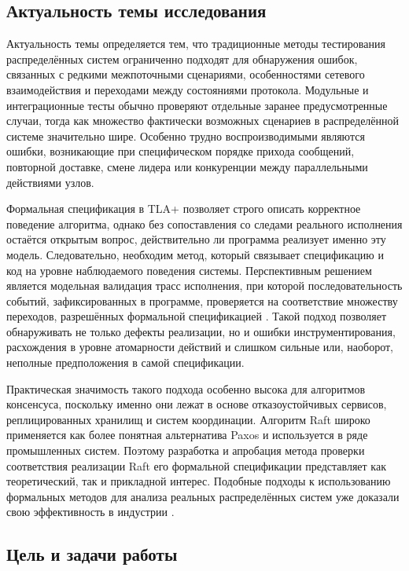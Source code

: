 \subsection*{Актуальность темы исследования}

Актуальность темы определяется тем, что традиционные методы тестирования
распределённых систем ограниченно подходят для обнаружения ошибок, связанных с
редкими межпоточными сценариями, особенностями сетевого взаимодействия и
переходами между состояниями протокола. Модульные и интеграционные тесты обычно
проверяют отдельные заранее предусмотренные случаи, тогда как множество
фактически возможных сценариев в распределённой системе значительно шире.
Особенно трудно воспроизводимыми являются ошибки, возникающие при специфическом
порядке прихода сообщений, повторной доставке, смене лидера или конкуренции
между параллельными действиями узлов.

Формальная спецификация в TLA+ позволяет строго описать корректное поведение
алгоритма, однако без сопоставления со следами реального исполнения остаётся
открытым вопрос, действительно ли программа реализует именно эту модель.
Следовательно, необходим метод, который связывает спецификацию и код на уровне
наблюдаемого поведения системы. Перспективным решением является модельная
валидация трасс исполнения, при которой последовательность событий,
зафиксированных в программе, проверяется на соответствие множеству переходов,
разрешённых формальной спецификацией \cite{howard2011tracechecking}. Такой
подход позволяет обнаруживать не только дефекты реализации, но и ошибки
инструментирования, расхождения в уровне атомарности действий и слишком сильные
или, наоборот, неполные предположения в самой спецификации.

Практическая значимость такого подхода особенно высока для алгоритмов
консенсуса, поскольку именно они лежат в основе отказоустойчивых сервисов,
реплицированных хранилищ и систем координации. Алгоритм Raft широко применяется
как более понятная альтернатива Paxos и используется в ряде промышленных
систем. Поэтому разработка и апробация метода проверки соответствия реализации
Raft его формальной спецификации представляет как теоретический, так и
прикладной интерес. Подобные подходы к использованию формальных методов для
анализа реальных распределённых систем уже доказали свою эффективность в
индустрии \cite{newcombe2015aws}.

\subsection*{Цель и задачи работы}

